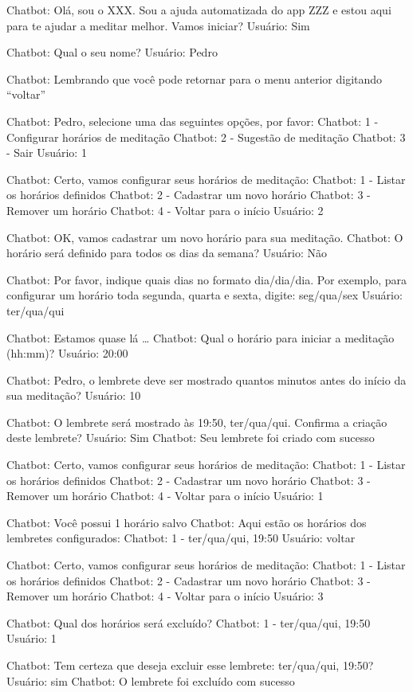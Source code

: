 Chatbot: Olá, sou o XXX. Sou a ajuda automatizada do app ZZZ e estou aqui para te ajudar a meditar melhor. Vamos iniciar?
Usuário: Sim

Chatbot: Qual o seu nome?
Usuário: Pedro

Chatbot: Lembrando que você pode retornar para o menu anterior digitando “voltar” 

Chatbot: Pedro, selecione uma das seguintes opções, por favor:
Chatbot: 1 - Configurar horários de meditação
Chatbot: 2 - Sugestão de meditação
Chatbot: 3 - Sair 
Usuário: 1

Chatbot: Certo, vamos configurar seus horários de meditação:
Chatbot: 1 - Listar os horários definidos
Chatbot: 2 - Cadastrar um novo horário
Chatbot: 3 - Remover um horário
Chatbot: 4 - Voltar para o início
Usuário: 2

Chatbot: OK, vamos cadastrar um novo horário para sua meditação.
Chatbot: O horário será definido para todos os dias da semana?
Usuário: Não

Chatbot: Por favor, indique quais dias no formato dia/dia/dia. Por exemplo, para configurar um horário toda segunda, quarta e sexta, digite: seg/qua/sex
Usuário: ter/qua/qui

Chatbot: Estamos quase lá …
Chatbot: Qual o horário para iniciar a meditação (hh:mm)?
Usuário: 20:00

Chatbot: Pedro, o lembrete deve ser mostrado quantos minutos antes do início da sua meditação?
Usuário: 10

Chatbot: O lembrete será mostrado às 19:50, ter/qua/qui. Confirma a criação deste lembrete?
Usuário: Sim
Chatbot: Seu lembrete foi criado com sucesso

Chatbot: Certo, vamos configurar seus horários de meditação:
Chatbot: 1 - Listar os horários definidos
Chatbot: 2 - Cadastrar um novo horário
Chatbot: 3 - Remover um horário
Chatbot: 4 - Voltar para o início
Usuário: 1

Chatbot: Você possui 1 horário salvo
Chatbot: Aqui estão os horários dos lembretes configurados:
Chatbot: 1 - ter/qua/qui, 19:50
Usuário: voltar

Chatbot: Certo, vamos configurar seus horários de meditação:
Chatbot: 1 - Listar os horários definidos
Chatbot: 2 - Cadastrar um novo horário
Chatbot: 3 - Remover um horário
Chatbot: 4 - Voltar para o início
Usuário: 3

Chatbot: Qual dos horários será excluído?
Chatbot: 1 - ter/qua/qui, 19:50
Usuário: 1

Chatbot: Tem certeza que deseja excluir esse lembrete: ter/qua/qui, 19:50?
Usuário: sim
Chatbot: O lembrete foi excluído com sucesso

